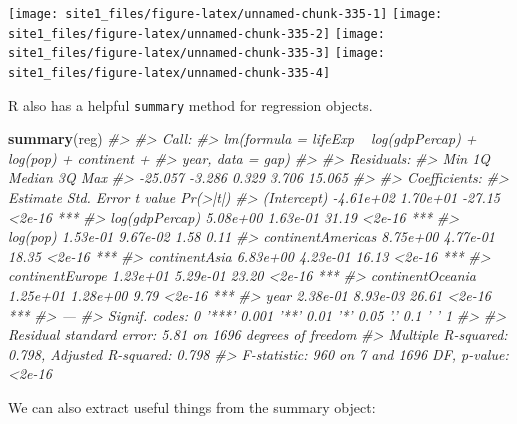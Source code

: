 \documentclass[]{book}
\newenvironment{Shaded}{\begin{snugshade}}{\end{snugshade}}
\newcommand{\CommentTok}[1]{\textcolor[rgb]{0.56,0.35,0.01}{\textit{#1}}}
\newcommand{\KeywordTok}[1]{\textcolor[rgb]{0.13,0.29,0.53}{\textbf{#1}}}
\newcommand{\NormalTok}[1]{#1}
\begin{document}
\begin{center}\texttt{[image: site1\_files/figure-latex/unnamed-chunk-335-1]} \texttt{[image: site1\_files/figure-latex/unnamed-chunk-335-2]} \texttt{[image: site1\_files/figure-latex/unnamed-chunk-335-3]} \texttt{[image: site1\_files/figure-latex/unnamed-chunk-335-4]} \end{center}

R also has a helpful \texttt{summary} method for regression objects.

\begin{Shaded}
\begin{Highlighting}[]
\KeywordTok{summary}\NormalTok{(reg)}
\CommentTok{#> }
\CommentTok{#> Call:}
\CommentTok{#> lm(formula = lifeExp ~ log(gdpPercap) + log(pop) + continent + }
\CommentTok{#>     year, data = gap)}
\CommentTok{#> }
\CommentTok{#> Residuals:}
\CommentTok{#>     Min      1Q  Median      3Q     Max }
\CommentTok{#> -25.057  -3.286   0.329   3.706  15.065 }
\CommentTok{#> }
\CommentTok{#> Coefficients:}
\CommentTok{#>                    Estimate Std. Error t value Pr(>|t|)    }
\CommentTok{#> (Intercept)       -4.61e+02   1.70e+01  -27.15   <2e-16 ***}
\CommentTok{#> log(gdpPercap)     5.08e+00   1.63e-01   31.19   <2e-16 ***}
\CommentTok{#> log(pop)           1.53e-01   9.67e-02    1.58     0.11    }
\CommentTok{#> continentAmericas  8.75e+00   4.77e-01   18.35   <2e-16 ***}
\CommentTok{#> continentAsia      6.83e+00   4.23e-01   16.13   <2e-16 ***}
\CommentTok{#> continentEurope    1.23e+01   5.29e-01   23.20   <2e-16 ***}
\CommentTok{#> continentOceania   1.25e+01   1.28e+00    9.79   <2e-16 ***}
\CommentTok{#> year               2.38e-01   8.93e-03   26.61   <2e-16 ***}
\CommentTok{#> ---}
\CommentTok{#> Signif. codes:  0 '***' 0.001 '**' 0.01 '*' 0.05 '.' 0.1 ' ' 1}
\CommentTok{#> }
\CommentTok{#> Residual standard error: 5.81 on 1696 degrees of freedom}
\CommentTok{#> Multiple R-squared:  0.798,  Adjusted R-squared:  0.798 }
\CommentTok{#> F-statistic:  960 on 7 and 1696 DF,  p-value: <2e-16}
\end{Highlighting}
\end{Shaded}

We can also extract useful things from the summary object:
\end{document}
